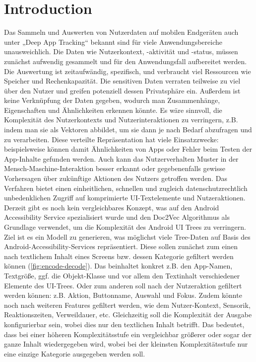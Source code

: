 \chapter{Introduction}
\label{sec:introduction}

Das Sammeln und Auswerten von Nutzerdaten auf mobilen Endgeräten auch unter „Deep App Tracking“ bekannt sind für viele Anwendungsbereiche unausweichlich. Die Daten wie Nutzerkontext, -aktivität und -status, müssen zunächst aufwendig gesammelt und für den Anwendungsfall aufbereitet werden. Die Auswertung ist zeitaufwändig, spezifisch, und verbraucht viel Ressourcen wie Speicher und Rechenkapazität. Die sensitiven Daten verraten teilweise zu viel über den Nutzer und greifen potenziell dessen Privatsphäre ein. Außerdem ist keine Verknüpfung der Daten gegeben, wodurch man Zusammenhänge, Eigenschaften und Ähnlichkeiten erkennen könnte.
Es wäre sinnvoll, die Komplexität des Nutzerkontexts und Nutzerinteraktionen zu verringern, z.B. indem man sie als Vektoren abbildet, um sie dann je nach Bedarf abzufragen und zu verarbeiten. Diese verteilte Repräsentation hat viele Einsatzzwecke: beispielsweise können damit Ähnlichkeiten von Apps oder Fehler beim Testen der App-Inhalte gefunden werden. Auch kann das Nutzerverhalten Muster in der Mensch-Maschine-Interaktion besser erkannt oder gegebenenfalls gewisse Vorhersagen über zukünftige Aktionen des Nutzers getroffen werden. 
Das Verfahren bietet einen einheitlichen, schnellen und zugleich datenschutzrechtlich unbedenklichen Zugriff auf komprimierte UI-Textelemente und Nutzeraktionen. Derzeit gibt es noch kein vergleichbares Konzept, was auf den Android Accessibility Service spezialisiert wurde und den Doc2Vec Algorithmus als Grundlage verwendet, um die Komplexität des Android UI Trees zu verringern.
Ziel ist es ein Modell zu generieren, was möglichst viele Tree-Daten auf Basis des Android-Accessibility-Services repräsentiert. Diese sollen zunächst zum einen nach textlichem Inhalt eines Screens bzw. dessen Kategorie gefiltert werden können (\ref{fig:encode-decode}). Das beinhaltet konkret z.B. den App-Namen, Textgröße, ggf. die Objekt-Klasse und vor allem den Textinhalt verschiedener Elemente des UI-Trees. Oder zum anderen soll nach der Nutzeraktion gefiltert werden können: z.B. Aktion, Buttonname, Auswahl und Fokus. Zudem könnte noch nach weiteren Features gefiltert werden, wie dem Nutzer-Kontext, Sensorik, Reaktionszeiten, Verweildauer, etc. Gleichzeitig soll die Komplexität der Ausgabe konfigurierbar sein, wobei dies nur den textlichen Inhalt betrifft. Das bedeutet, dass bei einer höheren Komplexitätsstufe ein vergleichbar größerer oder sogar der ganze Inhalt wiedergegeben wird, wobei bei der kleinsten Komplexitätsstufe nur eine einzige Kategorie ausgegeben werden soll.

